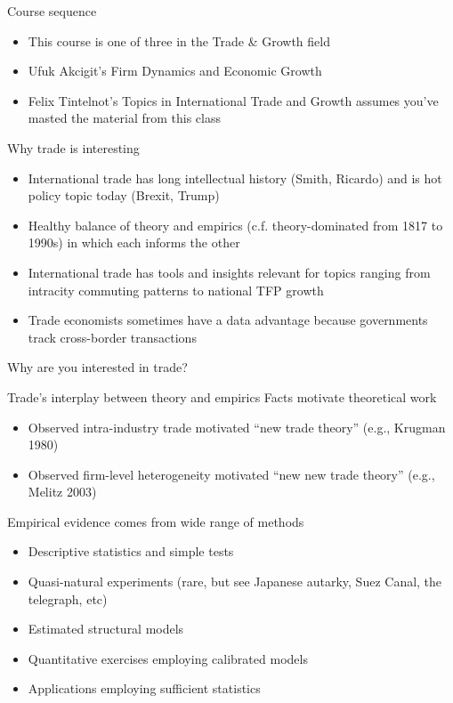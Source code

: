\documentclass[10pt,notes=hide]{beamer}
\begin{document}
\begin{frame}{Course sequence}
\begin{itemize}
	\item This course is one of three in the Trade \& Growth field
	\item Ufuk Akcigit's Firm Dynamics and Economic Growth
	\item Felix Tintelnot's Topics in International Trade and Growth assumes you've masted the material from this class
\end{itemize}
\end{frame}
\begin{frame}{Why trade is interesting}
\begin{itemize}
	\item International trade has long intellectual history (Smith, Ricardo) and is hot policy topic today (Brexit, Trump)
	\item Healthy balance of theory and empirics (c.f. theory-dominated from 1817 to 1990s) in which each informs the other
	\item International trade has tools and insights relevant for topics ranging from intracity commuting patterns to national TFP growth
	\item Trade economists sometimes have a data advantage because governments track cross-border transactions
\end{itemize}
\vspace{0.5cm}
Why are you interested in trade?
\end{frame}
\begin{frame}{Trade's interplay between theory and empirics}
Facts motivate theoretical work
\begin{itemize}
	\item Observed intra-industry trade motivated ``new trade theory'' (e.g., Krugman 1980)
	\item Observed firm-level heterogeneity motivated ``new new trade theory'' (e.g., Melitz 2003)
\end{itemize}
Empirical evidence comes from wide range of methods
\begin{itemize}
	\item Descriptive statistics and simple tests
	\item Quasi-natural experiments (rare, but see Japanese autarky, Suez Canal, the telegraph, etc)
	\item Estimated structural models
	\item Quantitative exercises employing calibrated models
	\item Applications employing sufficient statistics
\end{itemize}
\end{frame}
\end{document}
